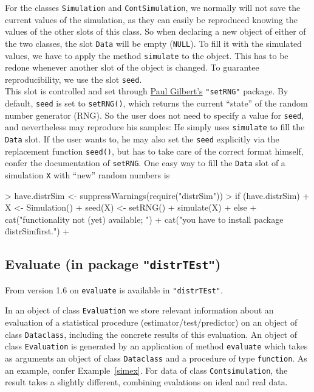 \documentclass[11pt]{article}
\newcommand{\code}[1]{{\tt #1}}
\newcommand{\pkg}[1]{{\tt "#1"}}
\begin{document}
For the classes \code{Simulation} and \code{ContSimulation}, we normally will
not save the current values of the simulation, as they can easily be reproduced
knowing the values of the other slots of this class.
%
So when declaring a new object of either of the two classes, the slot \code{Data}
will be empty (\code{NULL}).
To fill it with the simulated values, we have to apply the method \code{simulate} to the object.
This has to be redone whenever another slot of the object is changed.
%
To guarantee reproducibility, we use the slot \code{seed}.\\
%
This slot is controlled and set through \href{mailto:pgilbert@bank-banque-canada.ca}{Paul Gilbert's} \pkg{setRNG} package.
By default, \code{seed} is set to \code{setRNG()}, which returns the current ``state'' of the
random number generator (RNG). So the user does not need to specify a value for \code{seed},
and nevertheless may reproduce his samples: He simply uses \code{simulate} to fill the \code{Data} slot.
If the user wants to, he may also set the \code{seed} explicitly via the replacement function
\code{seed()}, but has to take care of the correct format himself, confer the documentation of \code{setRNG}.
One easy way to fill the \code{Data} slot of a simulation \code{X} with ``new'' random numbers is
\begin{Schunk}
\begin{Sinput}
> have.distrSim <- suppressWarnings(require("distrSim"))
> if (have.distrSim) {
+     X <- Simulation()
+     seed(X) <- setRNG()
+     simulate(X)
+ } else {
+     cat("\n functionality not (yet) available; ")
+     cat("you have to install package \"distrSim\" first.\n")
+ }
\end{Sinput}
\end{Schunk}
%
\subsection[Evaluate (in package distrTEst)]{Evaluate (in package \pkg{distrTEst})}\label{evaluate}
%
From version 1.6 on \code{evaluate} is available in  \pkg{distrTEst}.

In an object of class \code{Evaluation}  we store relevant information
about an evaluation of a statistical procedure (estimator/test/predictor)
on an object of class \code{Dataclass}, including the concrete results of
this evaluation. An object of class \code{Evaluation}  is generated by an application
of method \code{evaluate} which takes as arguments an object of class 
\code{Dataclass} and a procedure of type \code{function}. As an example, 
confer Example~\ref{simex}.
For data of class \code{Contsimulation}, the result takes a slightly different,
combining evalations on ideal and real data.
%
\end{document}
